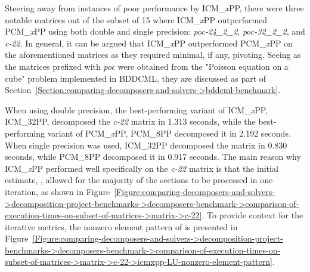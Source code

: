 Steering away from instances of poor performance by ICM\_\textit{x}PP, there were three notable matrices out of the subset of 15 where ICM\_\textit{x}PP outperformed PCM\_\textit{x}PP using both double and single precision: \textit{poc-24\_2\_2}, \textit{poc-32\_2\_2}, and \textit{c-22}. In general, it can be argued that ICM\_\textit{x}PP outperformed PCM\_\textit{x}PP on the aforementioned matrices as they required minimal, if any, pivoting. Seeing as the matrices prefixed with \textit{poc} were obtained from the "Poisson equation on a cube" problem implemented in BDDCML, they are discussed as part of Section~\ref{Section:comparing-decomposers-and-solvers->bddcml-benchmark}.

When using double precision, the best-performing variant of ICM\_\textit{x}PP, ICM\_32PP, decomposed the \textit{c-22} matrix in 1.313 seconds, while the best-performing variant of PCM\_\textit{x}PP, PCM\_8PP decomposed it in 2.192 seconds. When single precision was used, ICM\_32PP decomposed the matrix in 0.830 seconds, while PCM\_8PP decomposed it in 0.917 seconds. The main reason why ICM\_\textit{x}PP performed well specifically on the \textit{c-22} matrix is that the initial estimate, , allowed for the majority of the sections to be processed in one iteration, as shown in Figure~\ref{Figure:comparing-decomposers-and-solvers->decomposition-project-benchmarks->decomposers-benchmark->comparison-of-execution-times-on-subset-of-matrices->matrix->c-22}. To provide context for the iterative metrics, the nonzero element pattern of  is presented in Figure~\ref{Figure:comparing-decomposers-and-solvers->decomposition-project-benchmarks->decomposers-benchmark->comparison-of-execution-times-on-subset-of-matrices->matrix->c-22->icmxpp-LU-nonzero-element-pattern}.

